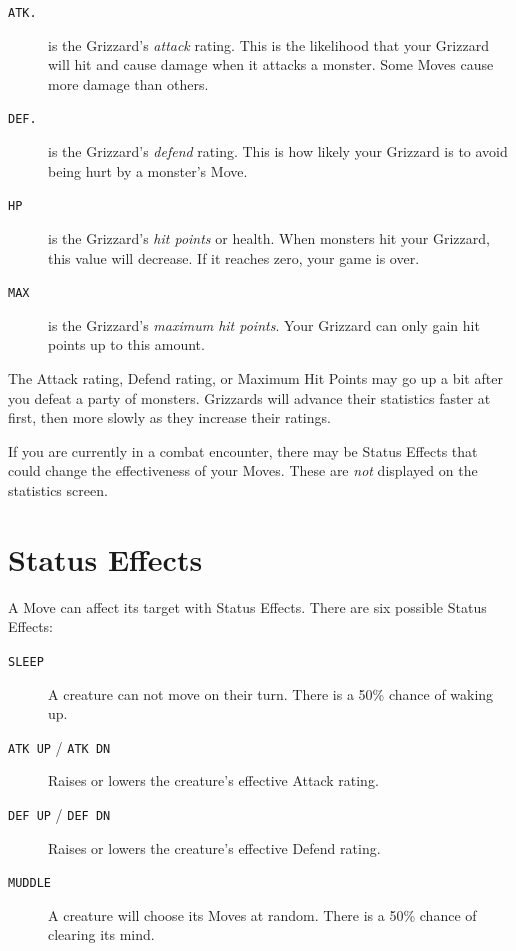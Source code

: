 \documentclass[10pt,twocolumn,openany,article]{memoir}
\begin{document}
\begin{description}
  
\item[\texttt{ATK.}] is the Grizzard's  \emph{attack} rating. This is the
  likelihood  that your  Grizzard  will  hit and  cause  damage when  it
  attacks a monster. Some Moves cause more damage than others.
  
\item[\texttt{DEF.}] is the Grizzard's \emph{defend} rating. This is how
  likely your Grizzard is to avoid being hurt by a monster's Move.

\item[\texttt{HP}]  is  the  Grizzard's  \emph{hit  points}  or  health.
  When  monsters hit  your Grizzard,  this  value will  decrease. If  it
  reaches zero, your game is over.

\item[\texttt{MAX}]  is   the  Grizzard's  \emph{maximum   hit  points}.
  Your Grizzard can only gain hit points up to this amount.
  
\end{description}

The Attack rating, Defend rating, or Maximum  Hit Points may go up a bit
after  you defeat  a party  of  monsters. Grizzards  will advance  their
statistics faster at first, then more slowly as they increase their ratings.

If you are currently in a  combat encounter, there may be Status Effects
that could change the effectiveness  of your Moves. These are \emph{not}
displayed on the statistics screen.

\section{Status Effects}\label{sec:StatusEffects}

A Move can affect its target with Status Effects. There are six possible
Status Effects:

\begin{description}
\item[\texttt{SLEEP}] A  creature can not  move on their turn.  There is
  a 50\% chance of waking up.
\item[\texttt{ATK UP} / \texttt{ATK DN}] Raises or lowers the creature's
  effective Attack rating.
\item[\texttt{DEF UP} / \texttt{DEF DN}] Raises or lowers the creature's
  effective Defend rating.
\item[\texttt{MUDDLE}]  A  creature will  choose  its  Moves at  random.
  There is a 50\% chance of clearing its mind.
\end{description}
\end{document}

